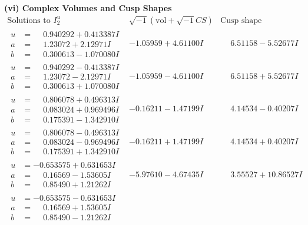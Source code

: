 \documentclass[1p]{elsarticle_modified}
\theoremstyle{definition}
\newcommand{\I}{\sqrt{-1}}
\begin{document}
\newpage\flushleft \textbf{(vi) Complex Volumes and Cusp Shapes}
$$\begin{array}{c|c|c}  
\text{Solutions to }I^u_{2}& \I (\text{vol} + \sqrt{-1}CS) & \text{Cusp shape}\\
 \hline 
\begin{aligned}
u &= \phantom{-}0.940292 + 0.413387 I \\
a &= \phantom{-}1.23072 + 2.12971 I \\
b &= \phantom{-}0.300613 - 1.070080 I\end{aligned}
 & -1.05959 + 4.61100 I & \phantom{-}6.51158 - 5.52677 I \\ \hline\begin{aligned}
u &= \phantom{-}0.940292 - 0.413387 I \\
a &= \phantom{-}1.23072 - 2.12971 I \\
b &= \phantom{-}0.300613 + 1.070080 I\end{aligned}
 & -1.05959 - 4.61100 I & \phantom{-}6.51158 + 5.52677 I \\ \hline\begin{aligned}
u &= \phantom{-}0.806078 + 0.496313 I \\
a &= \phantom{-}0.083024 + 0.969496 I \\
b &= \phantom{-}0.175391 - 1.342910 I\end{aligned}
 & -0.16211 - 1.47199 I & \phantom{-}4.14534 - 0.40207 I \\ \hline\begin{aligned}
u &= \phantom{-}0.806078 - 0.496313 I \\
a &= \phantom{-}0.083024 - 0.969496 I \\
b &= \phantom{-}0.175391 + 1.342910 I\end{aligned}
 & -0.16211 + 1.47199 I & \phantom{-}4.14534 + 0.40207 I \\ \hline\begin{aligned}
u &= -0.653575 + 0.631653 I \\
a &= \phantom{-}0.16569 - 1.53605 I \\
b &= \phantom{-}0.85490 + 1.21262 I\end{aligned}
 & -5.97610 - 4.67435 I & \phantom{-}3.55527 + 10.86527 I \\ \hline\begin{aligned}
u &= -0.653575 - 0.631653 I \\
a &= \phantom{-}0.16569 + 1.53605 I \\
b &= \phantom{-}0.85490 - 1.21262 I\end{aligned}

\end{array}$$
\end{document}
